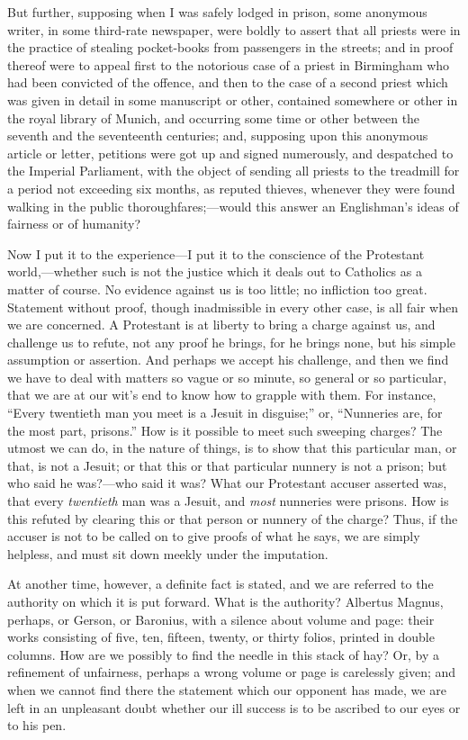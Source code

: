 But further, supposing when I was safely lodged in
prison, some anonymous writer, in some third-rate
newspaper, were boldly to assert that all priests were in
the practice of stealing pocket-books from passengers in
the streets; and in proof thereof were to appeal first to
the notorious case of a priest in Birmingham who had been
convicted of the offence, and then to the case of a
second priest which was given in detail in some
manuscript or other, contained somewhere or other in the
royal library of Munich, and occurring some time or other
between the seventh and the seventeenth centuries; and,
supposing upon this anonymous article or letter,
petitions were got up and signed numerously, and
despatched to the Imperial Parliament, with the object of
sending all priests to the treadmill for a period not
exceeding six months, as reputed thieves, whenever they
were found walking in the public
thoroughfares;—would this answer an Englishman's
ideas of fairness or of humanity?

Now I put it to the experience—I put it to the
conscience of the Protestant world,—whether such is
not the justice which it deals out to Catholics as a
matter of course. No evidence against us is too little;
no infliction too great. Statement without proof, though
inadmissible in every other case, is all fair when we are
concerned. A Protestant is at liberty to bring a charge
against us, and challenge us to refute, not any proof he
brings, for he brings none, but his simple assumption or
assertion. And perhaps we accept his challenge, and then
we find we have to deal with matters so vague or so
minute, so general or so particular, that we are at our
wit's end to know how to grapple with them. For instance,
``Every twentieth man you meet is a Jesuit in
disguise;'' or, ``Nunneries are, for the most
part, prisons.'' How is it possible to meet such
sweeping charges? The utmost we can do, in the nature of
things, is to show that this particular man, or that, is
not a Jesuit; or that this or that particular nunnery is
not a prison; but who said he was?—who said it was?
What our Protestant accuser asserted was, that every \emph{twentieth}
man was a Jesuit, and \emph{most} nunneries were
prisons. How is this refuted by clearing this or that
person or nunnery of the charge? Thus, if the accuser is
not to be called on to give proofs of what he says, we
are simply helpless, and must sit down meekly under the
imputation.

At another time, however, a definite fact is stated,
and we are referred to the authority on which it is put
forward. What is the authority? Albertus Magnus, perhaps,
or Gerson, or Baronius, with a silence about volume and
page: their works consisting of five, ten, fifteen,
twenty, or thirty folios, printed in double columns. How
are we possibly to find the needle in this stack of hay?
Or, by a refinement of unfairness, perhaps a wrong volume
or page is carelessly given; and when we cannot find there
the statement which our opponent has made, we are left in
an unpleasant doubt whether our ill success is to be
ascribed to our eyes or to his pen.

